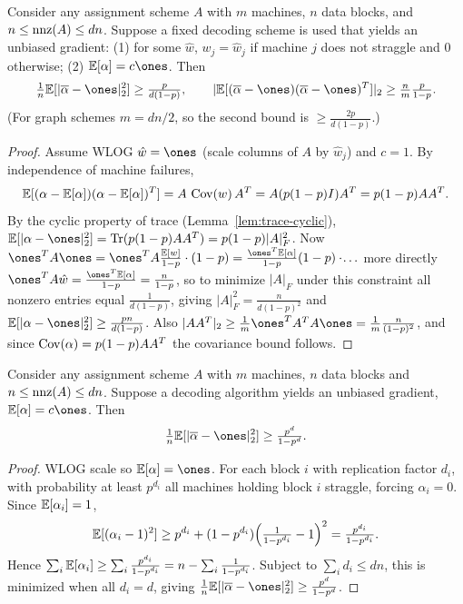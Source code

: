 \begin{proposition}
  \label{prop:fixed-lower}
  Consider any assignment scheme $A$ with $m$ machines, $n$ data blocks, and
  $n \le \operatorname{nnz}(A) \le dn$. Suppose a fixed decoding scheme is used that yields an
  unbiased gradient: (1) for some $\hat w$, $w_j = \hat w_j$ if machine $j$ does
  not straggle and $0$ otherwise; (2) $\E[\alpha] = c\ones$. Then
  \[
    \tfrac1n\E[|\overline{\alpha} - \ones|_2^2] \ge \tfrac{p}{d(1-p)},
    \qquad
    |\E[(\overline{\alpha} - \ones)(\overline{\alpha} - \ones)^T]|_2 \ge \tfrac{n}{m}\tfrac{p}{1-p}.
  \]
  (For graph schemes $m = dn/2$, so the second bound is
  $\ge \tfrac{2p}{d(1-p)}$.)
\end{proposition}
\begin{proof}
  Assume WLOG $\hat w = \ones$ (scale columns of $A$ by $\hat w_j$) and $c = 1$.
  By independence of machine failures,
  \[
    \mathbb{E}[(\alpha - \mathbb{E}[\alpha])(\alpha - \mathbb{E}[\alpha])^T]
      = A\,\operatorname{Cov}(w)\,A^T = A(p(1-p)I)A^T = p(1-p)AA^T .
  \]
  By the cyclic property of trace (Lemma~\ref{lem:trace-cyclic}),
  $\E[|\alpha - \ones|_2^2] = \Tr(p(1-p)AA^T) = p(1-p)|A|_F^2$. Now
  $\ones^TA\ones = \ones^TA\tfrac{\E[w]}{1-p}\cdot(1-p) = \tfrac{\ones^T\E[\alpha]}{1-p}(1-p)\cdot\!\ldots$
  more directly $\ones^TA\hat w = \tfrac{\ones^T\E[\alpha]}{1-p} = \tfrac{n}{1-p}$,
  so to minimize $|A|_F$ under this constraint all nonzero entries equal
  $\tfrac1{d(1-p)}$, giving $|A|_F^2 = \tfrac{n}{d(1-p)^2}$ and
  $\E[|\alpha - \ones|_2^2] \ge \tfrac{pn}{d(1-p)}$. Also
  $|AA^T|_2 \ge \tfrac1m\ones^TA^TA\ones = \tfrac1m\tfrac{n}{(1-p)^2}$, and since
  $\operatorname{Cov}(\alpha) = p(1-p)AA^T$ the covariance bound follows.
\end{proof}

\begin{proposition}
  \label{prop:any-lower}
  Consider any assignment scheme $A$ with $m$ machines, $n$ data blocks and
  $n \le \operatorname{nnz}(A) \le dn$. Suppose a decoding algorithm yields an unbiased
  gradient, $\E[\alpha] = c\ones$. Then
  \[
    \tfrac1n\E[|\overline{\alpha} - \ones|_2^2] \ge \tfrac{p^d}{1 - p^d}.
  \]
\end{proposition}
\begin{proof}
  WLOG scale so $\E[\alpha] = \ones$. For each block $i$ with replication factor
  $d_i$, with probability at least $p^{d_i}$ all machines holding block $i$
  straggle, forcing $\alpha_i = 0$. Since $\mathbb{E}[\alpha_i] = 1$,
  \[
    \mathbb{E}[(\alpha_i - 1)^2] \ge p^{d_i} + (1 - p^{d_i})\Big(\tfrac1{1 - p^{d_i}} - 1\Big)^2
      = \tfrac{p^{d_i}}{1 - p^{d_i}} .
  \]
  Hence $\sum_i \mathbb{E}[\alpha_i] \ge \sum_i \tfrac{p^{d_i}}{1-p^{d_i}}
  = n - \sum_i\tfrac1{1-p^{d_i}}$. Subject to $\sum_i d_i \le dn$, this is
  minimized when all $d_i = d$, giving
  $\tfrac1n\E[|\overline\alpha - \ones|_2^2] \ge \tfrac{p^d}{1-p^d}$.
\end{proof}


